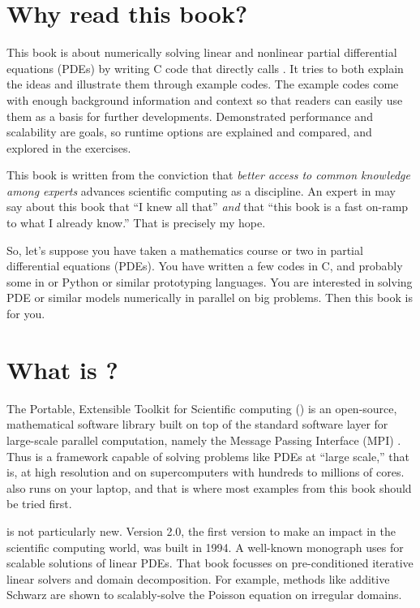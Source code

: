
\section{Why read this book?}

This book is about numerically solving linear and nonlinear partial differential equations (PDEs) by writing C code \citep{KernighanRitchie1988} that directly calls \PETSc.  It tries to both explain the ideas and illustrate them through example codes.  The example codes come with enough background information and context so that readers can easily use them as a basis for further developments.  Demonstrated performance and scalability are goals, so runtime options are explained and compared, and explored in the exercises.

This book is written from the conviction that \emph{better access to common knowledge among experts} advances scientific computing as a discipline.  An expert in \PETSc may say about this book that ``I knew all that'' \emph{and} that ``this book is a fast on-ramp to what I already know.''  That is precisely my hope.

So, let's suppose you have taken a mathematics course or two in partial differential equations (PDEs).  You have written a few codes in C, and probably some in \Matlab or Python or similar prototyping languages.  You are interested in solving PDE or similar models numerically in parallel on big problems.  Then this book is for you.

\section{What is \PETSc?}

The Portable, Extensible Toolkit for Scientific computing (\PETSc) is an open-source, mathematical software library built on top of the standard software layer for large-scale parallel computation, namely the Message Passing Interface (MPI) \citep{Groppetal1999}.  Thus \PETSc is a framework capable of solving problems like PDEs at ``large scale,'' that is, at high resolution and on supercomputers with hundreds to millions of cores.  \PETSc also runs on your laptop, and that is where most examples from this book should be tried first.

\PETSc is not particularly new.  Version 2.0, the first version to make an impact in the scientific computing world, was built in 1994.  A well-known monograph \citet{Smithetal1996} uses  for scalable solutions of linear PDEs.  That book focusses on pre-conditioned iterative linear solvers and domain decomposition.  For example, methods like additive Schwarz are shown to scalably-solve the Poisson equation on irregular domains.

